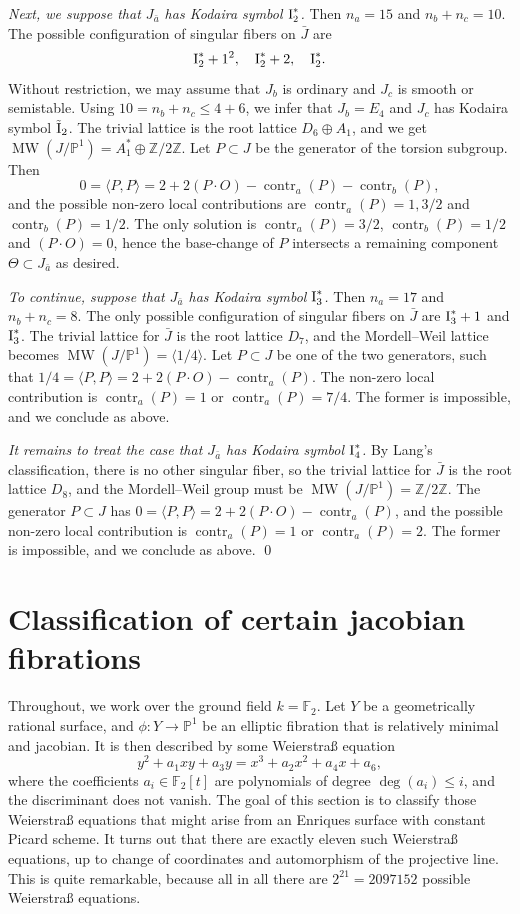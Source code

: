 \documentclass[oneside, 12pt]{amsart}
\newcommand\mylabel[1]{\label{#1}\marginpar{\vspace{-1ex}\medskip\medskip\footnotesize \tt #1}}
\renewcommand\mylabel[1]{\label{#1}}
\theoremstyle{definition}
\theoremstyle{remark}
\newcommand{\ZZ}{\mathbb{Z}}
\newcommand{\FF}{\mathbb{F}}
\newcommand{\PP}{\mathbb{P}}
\newcommand{\contr}{\operatorname{contr}}
\newcommand{\I}{\text{\rm I}}
\newcommand{\tI}{\text{\rm \~{I}}}
\newcommand{\MW}{\operatorname{MW}}
\newcommand{\ra}{\rightarrow}
\newcommand{\bJ}{{\bar{J}}}
\newcommand{\ba}{{\bar{a}}}
\begin{document}
\emph{Next, we suppose that $J_\ba$ has Kodaira symbol $\I_2^*$.}
Then $n_a=15$ and $n_b+n_c=10$.
The possible configuration of singular fibers
on $\bJ$ are
$$
\I_2^*+1^2,\quad \I_2^*+2,\quad \I_2^*.
$$
Without restriction, we may assume that $J_b$ is ordinary and $J_c$ is smooth or semi\-stable.
Using $10=n_b+n_c\leq 4+6$, we infer that $J_b=E_4$ and $J_c$ has Kodaira symbol $\tI_2$. 
The trivial lattice   is the root lattice $D_6\oplus A_1$, and we get
$\MW(J/\PP^1)=A_1^*\oplus\ZZ/2\ZZ$. Let $P\subset J$ be the
generator of the torsion subgroup.
Then
$$
0=\langle P,P\rangle = 2+2(P\cdot O) -\contr_a(P)-\contr_b(P),
$$
and the possible non-zero local contributions are $\contr_a(P)=1,3/2$ and $\contr_b(P)=1/2$.
The only solution is $\contr_a(P)=3/2$, $\contr_b(P)=1/2$ and $(P\cdot O)=0$,
hence the base-change of $P$ intersects a remaining component $\Theta\subset J_\ba$ as desired.

\emph{To continue, suppose that  $J_\ba$ has Kodaira symbol $\I_3^*$.}
Then $n_a=17$ and $n_b+n_c=8$. The only possible configuration of singular fibers 
on $\bJ$ are $\I_3^*+1$ and $\I_3^*$.
The trivial lattice for $\bJ$ is the root lattice $D_7$, and the Mordell--Weil lattice
becomes $\MW(J/\PP^1)=\langle 1/4\rangle$. Let $P\subset J$ be one of the two generators, such that 
$1/4=\langle P,P\rangle = 2+2(P\cdot O) -\contr_a(P)$. 
The   non-zero local contribution is $\contr_a(P)=1$ or $\contr_a(P)=7/4$.
The former is impossible, and we conclude as above.

\emph{It remains to treat the case that $J_\ba$ has Kodaira symbol $\I_4^*$.}
By Lang's classification, there is no other singular fiber,
so the trivial lattice for $\bJ$ is the root lattice $D_8$, and the Mordell--Weil group
must be $\MW(J/\PP^1)=\ZZ/2\ZZ$. The generator $P\subset J$ has
$0=\langle P,P\rangle = 2+2(P\cdot O) -\contr_a(P)$, and the possible non-zero local contribution is 
$\contr_a(P)=1$ or $\contr_a(P)=2$. The former is impossible, and we conclude as above.
\qed
\fi

\section{Classification of certain jacobian fibrations}
\mylabel{Classification jacobian}

Throughout, we work over the ground field $k=\FF_2$.
Let $Y$ be a geometrically rational surface, and $\phi:Y\ra\PP^1$ be an elliptic fibration that
is relatively minimal and jacobian. It is then described by some Weierstra\ss{} equation 
$$
y^2+a_1xy+a_3y = x^3+a_2x^2+a_4x+a_6,
$$
where the coefficients $a_i\in \FF_2[t]$ are polynomials of degree $\deg(a_i)\leq i$, and the discriminant does not vanish.
The goal of this section is to classify those Weierstra\ss{} equations that might arise from
an Enriques surface with constant Picard scheme.
It turns out that there are exactly eleven such Weierstra\ss{} equations, up to change of coordinates and
automorphism of the projective line.
This is quite remarkable, because all in all there are $2^{21}=2097152$ possible Weierstra\ss{} equations.
\end{document}
